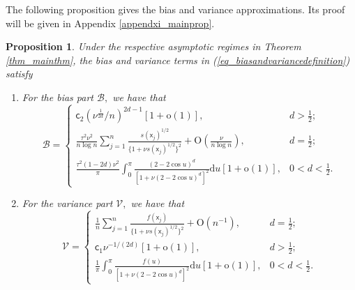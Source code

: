\documentclass[11pt]{article}
\newtheorem{proposition}[theorem]{Proposition}
\newcommand{\sfc}{\mathsf{c}}
\newcommand{\dd}{\mathrm{d}}
\newcommand{\OO}{\mathrm{O}}
\newcommand{\oo}{\mathrm{o}}
\newcommand{\sfx}{\mathsf{x}}
\numberwithin{equation}{section}
\numberwithin{figure}{section}
\begin{document}
The following proposition gives the bias and variance approximations. Its proof will be given in Appendix \ref{appendxi_mainprop}.

\begin{proposition}\label{propo_mainprop}
Under the respective asymptotic regimes in Theorem \ref{thm_mainthm}, the bias and variance terms in (\ref{eq_biasandvariancedefinition}) satisfy
\begin{enumerate}
\item[(1).] For the bias part $\mathcal{B},$ we have that 
\begin{equation*}
\mathcal{B}=
\begin{cases}
\sfc_{2}(\nu^{\frac{1}{2d}}/n)^{2d-1}[1+\oo(1)], & d>\frac{1}{2}; \\
\displaystyle \frac{\tau^2\nu^2}{n\log n}\sum_{j=1}^n\frac{s(\sfx_j)^{1/2}}{\{1+\nu s(\sfx_j)^{1/2}\}^2}+\OO\left(\frac{\nu}{n\log n}\right), & d=\frac{1}{2}; \\
\displaystyle \frac{\tau^2(1-2d)\nu^2}{\pi}\int_{0}^{\pi}\frac{(2-2\cos u)^d}{[1+\nu(2-2\cos u)^d]^2}\dd u[1+\oo(1)], & 0<d<\frac{1}{2}.
\end{cases}
\end{equation*}
\item[(2).] For the variance part $\mathcal{V},$ we have that 
\begin{equation*}
\mathcal{V}=
\begin{cases}
\displaystyle \frac{1}{n}\sum_{j=1}^n\frac{f(\sfx_j)}{\{1+\nu s(\sfx_j)^{1/2}\}^2}+\OO(n^{-1}), & d=\frac{1}{2}; \\
\sfc_{1}\nu^{-1/(2d)}[1+\oo(1)], & d>\frac{1}{2}; \\
\frac{1}{\pi}\int_{0}^{\pi} \frac{f(u)}{[1+\nu(2-2\cos u)^{d}]^{2}}\dd u[1+\oo(1)], & 0<d<\frac{1}{2}.
\end{cases}
\end{equation*} 
\end{enumerate}
\end{proposition}
\end{document}
